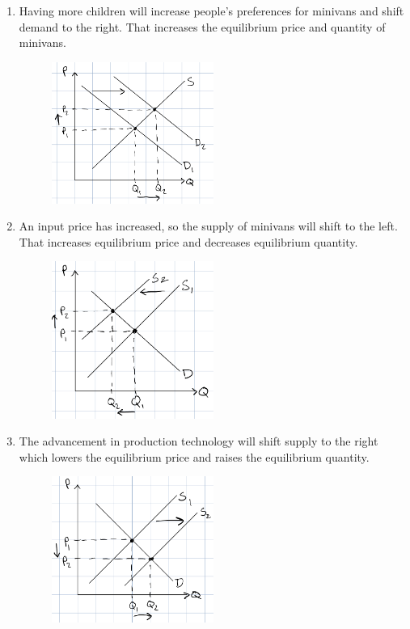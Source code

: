 \documentclass{article}
\begin{document}
\begin{enumerate}
\begin{enumerate}
	\item Having more children will increase people's preferences for minivans and shift demand to the right. That increases the equilibrium price and quantity of minivans.
	\begin{figure}[h]
	\centering
	\includegraphics[width = 0.5\textwidth]{problem6a}
	\end{figure}	
	
	\newpage
	
	\item An input price has increased, so the supply of minivans will shift to the left. That increases equilibrium price and decreases equilibrium quantity.
	\begin{figure}[h]
	\centering
	\includegraphics[width = 0.5\textwidth]{problem6b}
	\end{figure}
	
	\item The advancement in production technology will shift supply to the right which lowers the equilibrium price and raises the equilibrium quantity.
	\begin{figure}[h]
	\centering
	\includegraphics[width = 0.5\textwidth]{problem6c}
	\end{figure}
	

\end{enumerate}
\end{enumerate}
\end{document}
